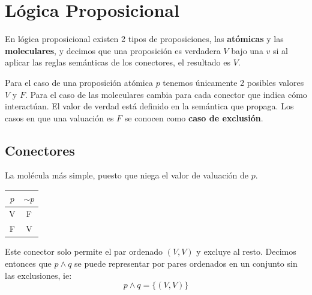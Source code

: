 \documentclass{book}
\begin{document}
  \section{Lógica Proposicional}
  
  En lógica proposicional existen 2 tipos de proposiciones, las \textbf{atómicas} y las
  \textbf{moleculares}, y decimos que una proposición es verdadera $V$ bajo una
   $v$
  si al aplicar las reglas semánticas de los conectores, el resultado es $V$.
  
  Para el caso de una proposición atómica $p$ tenemos únicamente 2 posibles valores $V$ y $F$.
  Para el caso de las moleculares cambia para cada conector que indica cómo interactúan.
  El valor de verdad está definido en la semántica que propaga. Los casos en que una valuación
  es $F$ se conocen como \textbf{caso de exclusión}.
  
  \subsection{Conectores}
  
  \begin{minipage}{0.55\textwidth}
    \begin{definition}[title=Negación]
      La molécula más simple, puesto que niega el valor de valuación de $p$.
    \end{definition}
  \end{minipage}

  \begin{minipage}{0.35\textwidth}
    \begin{tabular}{c|c}
      $p$ & $\sim p$ \\
      \hline
      V & F \\
      F & V \\
    \end{tabular}
  \end{minipage}
  
  \begin{minipage}{0.55\textwidth}
    \begin{definition}[title=Conjunción]
      Este conector solo permite el par ordenado $(V, V)$ y excluye al resto.
      Decimos entonces que $p \land q$ se puede representar por pares ordenados
      en un conjunto sin las exclusiones, ie:
      \begin{equation}
        p \land q = \{(V, V)\}
      \end{equation}
    \end{definition}
  \end{minipage}
\end{document}
